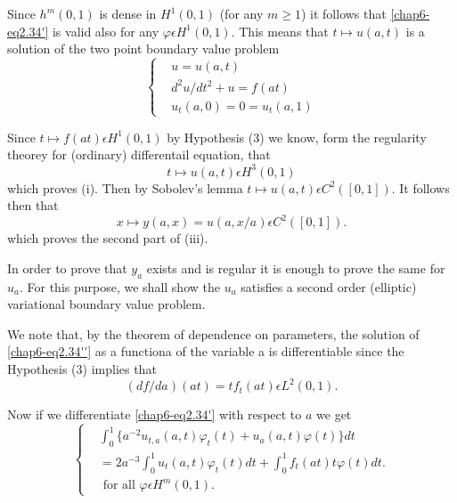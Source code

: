 Since $h^{m}(0, 1)$ is dense in $H^{1}(0, 1)$ (for any $m \geq 1$) it
follows that \ref{chap6-eq2.34'} is valid also for any $\varphi
\epsilon H^{1}(0, 1)$. This means that $t \mapsto u(a, t)$ is a
solution of the two point boundary value problem 
\begin{equation*}
\begin{cases}
& u = u(a, t)\\
& d^{2} u / dt^{2} + u = f(at)\\
& u_{t}(a, 0) = 0 = u_{t}(a, 1)\tag*{$(2.34)''$}\label{chap6-eq2.34''}
\end{cases}
\end{equation*}

Since $t \mapsto f(at) \epsilon H^{1}(0, 1)$ by Hypothesis (3) we know, form the regularity theorey for (ordinary) differentail equation, that
$$
t \mapsto u(a, t) \epsilon H^{3} (0, 1)
$$\pageoriginale
which proves (i). Then by Sobolev's lemma $t \mapsto u(a, t) \epsilon C^{2} ([0, 1])$. It follows then that
\begin{equation*}
x \mapsto y(a, x) = u(a, x/a) \epsilon C^{2} ([0, 1]).\tag{2.35}\label{chap6-eq2.35}
\end{equation*}
which proves the second part of (iii).

In order to prove that $y_{a}$ exists and is regular it is enough to
prove the same for $u_{a}$. For this purpose, we shall show the
$u_{a}$ satisfies a second order (elliptic) variational boundary value
problem. 

We note that, by the theorem of dependence on parameters, the solution
of \ref{chap6-eq2.34''} as a functiona of the variable a is
differentiable since the Hypothesis (3) implies that 
\begin{equation*}
(df/da)(at) = tf_{t} (at) \epsilon L^{2} (0, 1).\tag{2.36}\label{chap6-eq2.36}
\end{equation*}

Now if we differentiate \ref{chap6-eq2.34'} with respect to $a$ we get
\begin{equation*}
\begin{cases}
& \int_{0}^{1} \{a^{-2} u_{t, a}(a, t) \varphi_{t}(t) + u_{a} (a, t) \varphi(t) \} dt\\
& = 2a^{-3} \int_{0}^{1} u_{t} (a, t)\varphi_{t} (t) dt + \int_{0}^{1} f_{t} (at) t\varphi (t) dt.\\
& \text{ for all } \varphi \epsilon H^{m} (0, 1).\tag{2.37}\label{chap6-eq2.37}
\end{cases}
\end{equation*}

